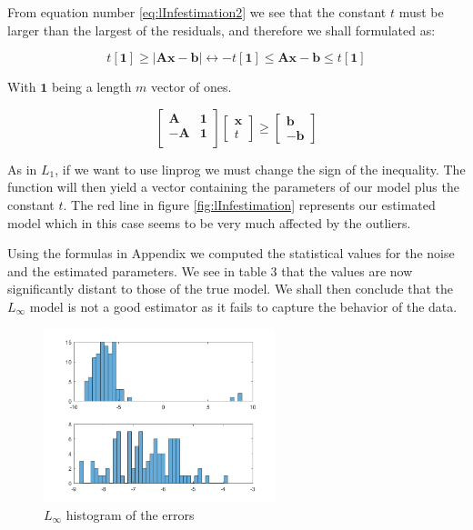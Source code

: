 From equation number \ref{eq:lInfestimation2} we see that the constant $t$ must be larger than the largest of the residuals, and therefore we shall formulated as:

\[
t [\mathbf{1}] \geq \vert \mathbf{A x} - \mathbf{b}\vert \leftrightarrow -t [\mathbf{1}]  \leq \mathbf{A x} - \mathbf{b} \leq t [\mathbf{1}]
\]

With $\mathbf{1}$ being a length $m$ vector of ones.

\[
\begin{bmatrix}
\mathbf{A} & \mathbf{1} \\
\mathbf{-A} & \mathbf{1} \\
\end{bmatrix} 
\begin{bmatrix}
\mathbf{x}\\
t
\end{bmatrix}
\geq 
\begin{bmatrix}
\mathbf{b}\\
-\mathbf{b}
\end{bmatrix}
\]

As in $L_1$, if we want to use linprog we must change the sign of the inequality. The function will then yield a vector containing the parameters of our model plus the constant $t$. The red line in figure \ref{fig:lInfestimation} represents our estimated model which in this case seems to be very much affected by the outliers.

Using the formulas in Appendix we computed the statistical values for the noise and the estimated parameters. We see in table 3 that the values are now significantly distant to those of the true model. We shall then conclude that the $L_\infty$ model is not a good estimator as it fails to capture the behavior of the data.

\begin{figure}[htb]
\centering
\includegraphics[width=0.6\textwidth]{../img/LInf_hist}
\caption{$L_\infty$ histogram of the errors}
\label{fig:lInfHist}
\end{figure}

